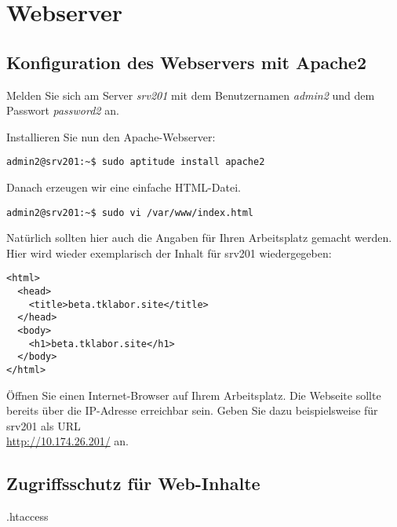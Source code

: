 \section{Webserver}

\subsection{Konfiguration des Webservers mit Apache2}
Melden Sie sich am Server \textit{srv201} mit dem Benutzernamen \textit{admin2}
und dem Passwort \textit{password2} an.

Installieren Sie nun den Apache-Webserver:
\begin{lstlisting}
admin2@srv201:~$ sudo aptitude install apache2
\end{lstlisting}

Danach erzeugen wir eine einfache HTML-Datei.
\begin{lstlisting}
admin2@srv201:~$ sudo vi /var/www/index.html
\end{lstlisting}
Natürlich sollten hier auch die Angaben für Ihren Arbeitsplatz gemacht werden. Hier wird wieder exemplarisch 
der Inhalt für srv201 wiedergegeben:
\begin{scriptsize}
\begin{lstlisting}
<html>
  <head>
    <title>beta.tklabor.site</title>
  </head>  
  <body>
    <h1>beta.tklabor.site</h1>
  </body>
</html>
\end{lstlisting}
\end{scriptsize}
Öffnen Sie einen Internet-Browser auf Ihrem Arbeitsplatz. Die Webseite sollte bereits über die IP-Adresse erreichbar sein. Geben Sie dazu
beispielsweise für srv201 als URL\\
\url{http://10.174.26.201/} an.

\subsection{Zugriffsschutz für Web-Inhalte}
.htaccess